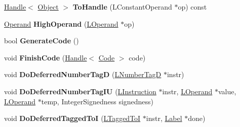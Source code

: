 \begin{DoxyCompactItemize}
\item 
\hyperlink{classv8_1_1internal_1_1_handle}{Handle}$<$ \hyperlink{classv8_1_1internal_1_1_object}{Object} $>$ {\bfseries To\+Handle} (L\+Constant\+Operand $\ast$op) const \hypertarget{classv8_1_1internal_1_1_l_code_gen_ab75f8785eb99d07a1585c9402a3b4d5e}{}\label{classv8_1_1internal_1_1_l_code_gen_ab75f8785eb99d07a1585c9402a3b4d5e}

\item 
\hyperlink{classv8_1_1internal_1_1_operand}{Operand} {\bfseries High\+Operand} (\hyperlink{classv8_1_1internal_1_1_l_operand}{L\+Operand} $\ast$op)\hypertarget{classv8_1_1internal_1_1_l_code_gen_a79c976de74c8a30744ac70125f9c88f3}{}\label{classv8_1_1internal_1_1_l_code_gen_a79c976de74c8a30744ac70125f9c88f3}

\item 
bool {\bfseries Generate\+Code} ()\hypertarget{classv8_1_1internal_1_1_l_code_gen_aa1307599a440d099f0dbb5dc24f4f59c}{}\label{classv8_1_1internal_1_1_l_code_gen_aa1307599a440d099f0dbb5dc24f4f59c}

\item 
void {\bfseries Finish\+Code} (\hyperlink{classv8_1_1internal_1_1_handle}{Handle}$<$ \hyperlink{classv8_1_1internal_1_1_code}{Code} $>$ code)\hypertarget{classv8_1_1internal_1_1_l_code_gen_a5278837d092b8413daa548719c34864c}{}\label{classv8_1_1internal_1_1_l_code_gen_a5278837d092b8413daa548719c34864c}

\item 
void {\bfseries Do\+Deferred\+Number\+TagD} (\hyperlink{classv8_1_1internal_1_1_l_number_tag_d}{L\+Number\+TagD} $\ast$instr)\hypertarget{classv8_1_1internal_1_1_l_code_gen_af3b589c0911c5e01a018ecee64b7e926}{}\label{classv8_1_1internal_1_1_l_code_gen_af3b589c0911c5e01a018ecee64b7e926}

\item 
void {\bfseries Do\+Deferred\+Number\+Tag\+IU} (\hyperlink{classv8_1_1internal_1_1_l_instruction}{L\+Instruction} $\ast$instr, \hyperlink{classv8_1_1internal_1_1_l_operand}{L\+Operand} $\ast$value, \hyperlink{classv8_1_1internal_1_1_l_operand}{L\+Operand} $\ast$temp, Integer\+Signedness signedness)\hypertarget{classv8_1_1internal_1_1_l_code_gen_aa8bd5ec8f4680ebda1be2da8478394d5}{}\label{classv8_1_1internal_1_1_l_code_gen_aa8bd5ec8f4680ebda1be2da8478394d5}

\item 
void {\bfseries Do\+Deferred\+Tagged\+ToI} (\hyperlink{classv8_1_1internal_1_1_l_tagged_to_i}{L\+Tagged\+ToI} $\ast$instr, \hyperlink{classv8_1_1internal_1_1_label}{Label} $\ast$done)\hypertarget{classv8_1_1internal_1_1_l_code_gen_aaa65e08043bc6272e8615222cb34e25f}{}\label{classv8_1_1internal_1_1_l_code_gen_aaa65e08043bc6272e8615222cb34e25f}


\end{DoxyCompactItemize}
